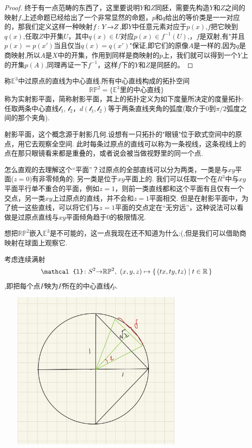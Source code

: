 \begin{proof}
终于有一点范畴的东西了，这里要说明$Y$和$Z$同胚，需要先构造$Y$和$Z$之间的映射$f$,上述命题已经给出了一个非常显然的命题，$p$和$q$给出的等价类是一一对应的，那我们定义这样一种映射${f}\colon{Y}{\to}{Z}$,即$Y$中任意元素对应于$p(x)$,$f$把它映到$q(x)$,任取$Z$中开集$U$，其中$q(x) \in U$对应$p(x) \in f^{-1}(U)$,，$f$是双射,有"并且$p(x)=p(x')$当且仅当$q(x)=q(x')$"保证,即它们的原像$A$是一样的,因为$q$是商映射,所以$A$是$X$中的开集，作用到同样是商映射的$p$上，我们就可以得到一个$Y$上的开集$p(A)$,同理再证一下$f^{-1}$，这样$f$下的$Y$和$Z$是同胚的。
\end{proof}

\begin{definition}
称$\mathbb{E}^3$中过原点的直线为中心直线.所有中心直线构成的拓扑空间\[\mathbb{R}\mathbb{P}^2=\{\mathbb{E}^3\text{里的中心直线}\}\]称为实射影平面，简称射影平面，其上的拓扑定义为如下度量所决定的度量拓扑: 任取两条中心直线$\mathcal{l}_1$, $\mathcal{l}_2$，$d(\mathcal{l}_1,\mathcal{l}_2)$等于两条直线夹角的弧度(取介于0到$\pi / 2$弧度之间的那个夹角).
\end{definition}

射影平面，这个概念源于射影几何.设想有一只拓扑的"眼镜"位于欧式空间中的原点，用它去观察全空间. 此时每条过原点的直线可以称为一条视线，这条视线上的点在那只眼镜看来都是重叠的，或者说会被当做视野里的同一个点.

怎么直观的去理解这个“平面”？过原点的全部直线可以分为两类，一类是与$xy$平面($z=0$)有非零倾角的; 另一类是位于$xy$平面上的. 我们可以任取一个在$R^3$中与$xy$平面平行单不重合的平面，例如$z=1$，则前一类直线都和这个平面有且仅有一个交点，另一类$xy$上过原点的直线，并不会和$z=1$平面相交. 但是在射影平面中，为了统一这些直线，可以将它们与$z=1$平面的交点定在“无穷远”，这种说法可以看做是过原点直线与$xy$平面倾角趋于0的极限情况.

想把$\mathbb{R}\mathbb{P}^2$嵌入$\mathbb{E}^3$是不可能的，这一点我现在还不知道为什么:(,但是我们可以借助商映射在球面上观察它.

考虑连续满射\[\func{\mathcal{l}}{S^2}{\mathbb{R}\mathbb{P}^2},\ (x,y,z) \mapsto \Set{(tx,ty,tz)}{t \in \mathbb{R}}\],即把每个点$P$映为$P$所在的中心直线$\mathcal{l}_P$.
\begin{center}
\includegraphics[width=10cm, height=8cm]{images/sp2.jpg}
\end{center}


